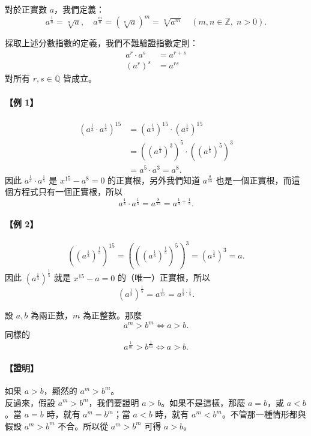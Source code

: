 \begin{definition*}
對於正實數 $a$，我們定義：
\[
a^{\frac{1}{n}} = \sqrt[n]{a},\quad a^{\frac{m}{n}} = (\sqrt[n]{a})^m = \sqrt[n]{a^m}\quad (m, n \in \mathbb{Z},\; n > 0).
\]
\end{definition*}

採取上述分數指數的定義，我們不難驗證指數定則：
\begin{align}
a^r \cdot a^s &= a^{r+s} \label{eq:b2-ch4-frac-exp-1} \\
(a^r)^s &= a^{rs} \label{eq:b2-ch4-frac-exp-2}
\end{align}
對所有 $r, s \in \mathbb{Q}$ 皆成立。

\paragraph{【例 1】}
\begin{align*}
(a^{\frac{1}{3}} \cdot a^{\frac{1}{5}})^{15} &= (a^{\frac{1}{3}})^{15} \cdot (a^{\frac{1}{5}})^{15} \\
&= ((a^{\frac{1}{3}})^3)^5 \cdot ((a^{\frac{1}{5}})^5)^3 \\
&= a^5 \cdot a^3 = a^8.
\end{align*}
因此 $a^{\frac{1}{3}} \cdot a^{\frac{1}{5}}$ 是 $x^{15} - a^8 = 0$ 的正實根，另外我們知道 $a^{\frac{8}{15}}$ 也是一個正實根，而這個方程式只有一個正實根，所以
\[
a^{\frac{1}{3}} \cdot a^{\frac{1}{5}} = a^{\frac{8}{15}} = a^{\frac{1}{3}+\frac{1}{5}}.
\]

\paragraph{【例 2】}
\[
((a^{\frac{1}{3}})^{\frac{1}{5}})^{15} = (((a^{\frac{1}{3}})^{\frac{1}{5}})^5)^3 = (a^{\frac{1}{3}})^3 = a.
\]
因此 $(a^{\frac{1}{3}})^{\frac{1}{5}}$ 就是 $x^{15} - a = 0$ 的（唯一）正實根，所以
\[
(a^{\frac{1}{3}})^{\frac{1}{5}} = a^{\frac{1}{15}} = a^{\frac{1}{3}\cdot \frac{1}{5}}.
\]

\begin{lemma}
設 $a, b$ 為兩正數，$m$ 為正整數。那麼
\[
a^m > b^m \iff a > b.
\]
同樣的
\[
a^{\frac{1}{m}} > b^{\frac{1}{m}} \iff a > b.
\]
\end{lemma}
\paragraph{【證明】} 如果 $a > b$，顯然的 $a^m > b^m$。\\
反過來，假設 $a^m > b^m$，我們要證明 $a > b$。如果不是這樣，那麼 $a = b$，或 $a < b$。當 $a = b$ 時，就有 $a^m = b^m$；當 $a < b$ 時，就有 $a^m < b^m$。不管那一種情形都與假設 $a^m > b^m$ 不合。所以從 $a^m > b^m$ 可得 $a > b$。

